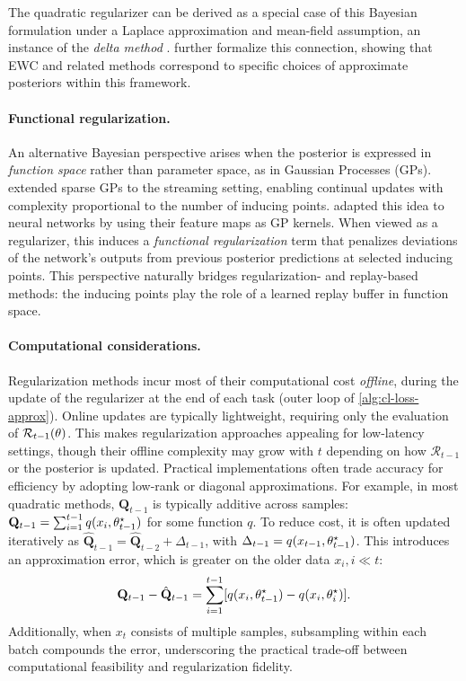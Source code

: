 \documentclass[10pt]{article} %
\begin{document}
The quadratic regularizer can be derived as a special case of this Bayesian formulation under a Laplace approximation and mean-field assumption, an instance of the \emph{delta method} \citep{oehlertNoteDeltaMethod1992}.  
\citet{khanKnowledgeAdaptationPosterior2025} further formalize this connection, showing that EWC and related methods correspond to specific choices of approximate posteriors within this framework.

\paragraph{Functional regularization.}
An alternative Bayesian perspective arises when the posterior is expressed in \emph{function space} rather than parameter space, as in Gaussian Processes (GPs).  
\citet{buiStreamingSparseGaussian2017a} extended sparse GPs to the streaming setting, enabling continual updates with complexity proportional to the number of inducing points.  
\citet{titsiasFunctionalRegularisationContinual2019} adapted this idea to neural networks by using their feature maps as GP kernels.  
When viewed as a regularizer, this induces a \emph{functional regularization} term \citep{panContinualDeepLearning2021} that penalizes deviations of the network’s outputs from previous posterior predictions at selected inducing points.  
This perspective naturally bridges regularization- and replay-based methods: the inducing points play the role of a learned replay buffer in function space.

\paragraph{Computational considerations.}
Regularization methods incur most of their computational cost \emph{offline}, during the update of the regularizer at the end of each task (outer loop of \cref{alg:cl-loss-approx}).  
Online updates are typically lightweight, requiring only the evaluation of $\mathcal{R}_{t-1}(\theta)$.  
This makes regularization approaches appealing for low-latency settings, though their offline complexity may grow with $t$ depending on how $\mathcal{R}_{t-1}$ or the posterior is updated.  
Practical implementations often trade accuracy for efficiency by adopting low-rank or diagonal approximations. For example, in most quadratic methods, $\mathbf{Q}_{t-1}$ is typically additive across samples:
$\mathbf{Q}_{t-1} = \sum_{i=1}^{t-1} q(x_i, \theta_{t-1}^\star)$ for some function $q$.  
To reduce cost, it is often updated iteratively as 
$\hat{\mathbf{Q}}_{t-1} = \hat{\mathbf{Q}}_{t-2} + \Delta_{t-1}$, with $\Delta_{t-1} = q(x_{t-1}, \theta_{t-1}^\star)$. This introduces an approximation error, which is greater on the older data $x_i, i \ll t$:
\[
\mathbf{Q}_{t-1} - \hat{\mathbf{Q}}_{t-1} 
= \sum_{i=1}^{t-1} [q(x_i, \theta_{t-1}^\star) - q(x_i, \theta_i^\star)].
\]
Additionally, when $x_t$ consists of multiple samples, subsampling within each batch compounds the error, underscoring the practical trade-off between computational feasibility and regularization fidelity.
\end{document}
